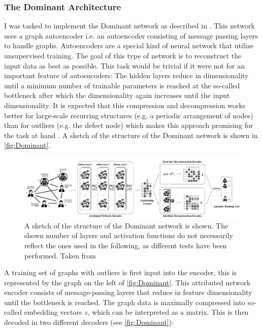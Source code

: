 \documentclass[11pt,a4paper]{article}
\begin{document}
\subsubsection{The Dominant Architecture}
I was tasked to implement the Dominant network as described in \cite{dingDeepAnomalyDetection2019}. 
This network uses a graph autoencoder i.e. an autoencoder consisting of message passing layers to handle graphs. 
Autoencoders are a special kind of neural network that utilize unsupervised training. 
The goal of this type of network is to reconstruct the input data as best as possible. 
This task would be trivial if it were not for an important feature of autoencoders: 
The hidden layers reduce in dimensionality until a minimum number of trainable parameters is reached at the so-called bottleneck after which the dimensionality again increases until the input dimensionality. 
It is expected that this compression and decompression works better for large-scale recurring structures (e.g. a periodic arrangement of nodes) than for outliers (e.g. the defect node) which makes this approach promising for the task at hand \cite{dingDeepAnomalyDetection2019}. 
A sketch of the structure of the Dominant network is shown in \autoref{fig:Dominant}.
\begin{figure}[htbp]
\centering
\includegraphics[width=\textwidth]{images/ding_1.png}
\caption{A sketch of the structure of the Dominant network is shown. The shown number of layers and activation functions do not necessarily reflect the ones used in the following, as different tests have been performed. Taken from \cite[Fig.1]{dingDeepAnomalyDetection2019}}
\label{fig:Dominant}
\end{figure}
A training set of graphs with outliers is first input into the encoder, this is represented by the graph on the left of \autoref{fig:Dominant}. 
This attributed network encoder consists of message-passing layers that reduce in feature dimensionality until the bottleneck is reached. 
The graph data is maximally compressed into so-called embedding vectors $z$, which can be interpreted as a matrix. 
This is then decoded in two different decoders (see \autoref{fig:Dominant}): 
\end{document}
